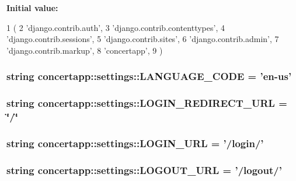 \label{namespaceconcertapp_1_1settings_ac6706d774882b41555116e1e4f878125}
{\bfseries Initial value:}
\begin{DoxyCode}
1 (
2     'django.contrib.auth',
3     'django.contrib.contenttypes',
4     'django.contrib.sessions',
5     'django.contrib.sites',
6     'django.contrib.admin',
7     'django.contrib.markup',
8     'concertapp',
9 )
\end{DoxyCode}
\hypertarget{namespaceconcertapp_1_1settings_ab73877b42d35dadee56c05eb29b51642}{
\subsubsection[{LANGUAGE\_\-CODE}]{\setlength{\rightskip}{0pt plus 5cm}string {\bf concertapp::settings::LANGUAGE\_\-CODE} = 'en-\/us'}}
\label{namespaceconcertapp_1_1settings_ab73877b42d35dadee56c05eb29b51642}
\hypertarget{namespaceconcertapp_1_1settings_ac5a928a667ed8cb8547768d33726fb7c}{
\subsubsection[{LOGIN\_\-REDIRECT\_\-URL}]{\setlength{\rightskip}{0pt plus 5cm}string {\bf concertapp::settings::LOGIN\_\-REDIRECT\_\-URL} = \char`\"{}/\char`\"{}}}
\label{namespaceconcertapp_1_1settings_ac5a928a667ed8cb8547768d33726fb7c}
\hypertarget{namespaceconcertapp_1_1settings_a395e8c4edacb23139ab60f206ac79930}{
\subsubsection[{LOGIN\_\-URL}]{\setlength{\rightskip}{0pt plus 5cm}string {\bf concertapp::settings::LOGIN\_\-URL} = '/login/'}}
\label{namespaceconcertapp_1_1settings_a395e8c4edacb23139ab60f206ac79930}
\hypertarget{namespaceconcertapp_1_1settings_a8f3737759fae0b36514d05db8d388810}{
\subsubsection[{LOGOUT\_\-URL}]{\setlength{\rightskip}{0pt plus 5cm}string {\bf concertapp::settings::LOGOUT\_\-URL} = '/logout/'}}
